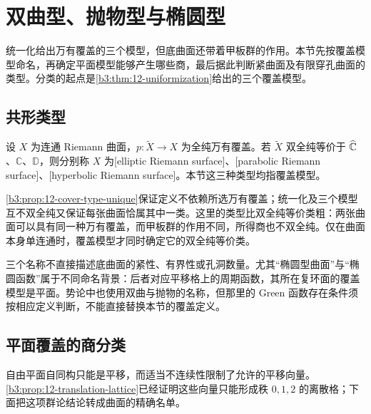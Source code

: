 \section{双曲型、抛物型与椭圆型}
\label{b3:sec:1203}

统一化给出万有覆盖的三个模型，但底曲面还带着甲板群的作用。本节先按覆盖模型命名，再确定平面模型能够产生哪些商，最后据此判断紧曲面及有限穿孔曲面的类型。分类的起点是\cref{b3:thm:12-uniformization}给出的三个覆盖模型。

\subsection{共形类型}
\label{b3:subsec:120301}

\begin{definition}\label{b3:def:12-conformal-types}
设 \(X\) 为连通 Riemann 曲面，\(p:\widetilde X\rightarrow X\) 为全纯万有覆盖。若 \(\widetilde X\) 双全纯等价于 \(\widehat{\mathbb C\kern0pt}\)、\(\mathbb C\)、\(\mathbb D\)，则分别称 \(X\) 为[elliptic Riemann surface]、[parabolic Riemann surface]、[hyperbolic Riemann surface]。本节这三种类型均指覆盖模型。
\end{definition}

\cref{b3:prop:12-cover-type-unique}保证定义不依赖所选万有覆盖；统一化及三个模型互不双全纯又保证每张曲面恰属其中一类。这里的类型比双全纯等价类粗：两张曲面可以具有同一种万有覆盖，而甲板群的作用不同，所得商也不双全纯。仅在曲面本身单连通时，覆盖模型才同时确定它的双全纯等价类。

\ProseParagraphBreak
三个名称不直接描述底曲面的紧性、有界性或孔洞数量。尤其“椭圆型曲面”与“椭圆函数”属于不同命名背景：后者对应平移格上的周期函数，其所在复环面的覆盖模型是平面。势论中也使用双曲与抛物的名称，但那里的 Green 函数存在条件须按相应定义判断，不能直接替换本节的覆盖定义。

\subsection{平面覆盖的商分类}
\label{b3:subsec:120302}

自由平面自同构只能是平移，而适当不连续性限制了允许的平移向量。\cref{b3:prop:12-translation-lattice}已经证明这些向量只能形成秩 \(0,1,2\) 的离散格；下面把这项群论结论转成曲面的精确名单。

